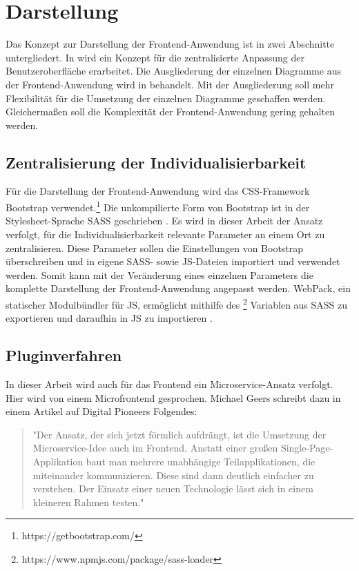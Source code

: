 \section{Darstellung}
\label{sec:darstellung}
Das Konzept zur Darstellung der Frontend-Anwendung ist in zwei Abschnitte untergliedert.
In  wird ein Konzept für die
zentralisierte Anpassung der Benutzeroberfläche erarbeitet. Die Ausgliederung der einzelnen
Diagramme aus der Frontend-Anwendung wird in  behandelt.
Mit der Ausgliederung soll mehr Flexibilität für die Umsetzung der einzelnen Diagramme geschaffen werden.
Gleichermaßen soll die Komplexität der Frontend-Anwendung gering gehalten werden.

\subsection{Zentralisierung der Individualisierbarkeit}
\label{subsec:zentralisierungderindividualisierbarkeit}
Für die Darstellung der Frontend-Anwendung wird das CSS-Framework Bootstrap verwendet.\footnote{https://getbootstrap.com/}
Die unkompilierte Form von Bootstrap ist in der Stylesheet-Sprache SASS geschrieben \cite[2. Abschnitt]{Bootstrap4punkt4}.
Es wird in dieser Arbeit der Ansatz verfolgt, für die Individualisierbarkeit relevante Parameter an einem Ort
zu zentralisieren. Diese Parameter sollen die Einstellungen von Bootstrap überschreiben und
in eigene SASS- sowie JS-Dateien importiert und verwendet werden. Somit kann mit der Veränderung
eines einzelnen Parameters die komplette Darstellung der Frontend-Anwendung angepasst werden.
WebPack, ein statischer Modulbündler für JS, ermöglicht mithilfe des \footnote{https://www.npmjs.com/package/sass-loader} Variablen
aus SASS zu exportieren und daraufhin in JS zu importieren \cite{ShareSCSSwithJS}.

\subsection{Pluginverfahren}
\label{subsec:pluginverfahren}
In dieser Arbeit wird auch für das Frontend ein Microservice-Ansatz verfolgt.
Hier wird von einem Microfrontend gesprochen. Michael Geers schreibt dazu
in einem Artikel auf Digital Pioneers Folgendes:

\begin{quote}
"Der Ansatz, der sich jetzt förmlich aufdrängt, ist die Umsetzung der Microservice\hyp{}Idee
auch im Frontend. Anstatt einer ­großen Single\hyp{}Page\hyp{}Applikation baut man mehrere unabhängige
Teilapplikationen, die miteinander kommunizieren. Diese sind dann deutlich einfacher zu verstehen.
Der Einsatz einer neuen Technologie lässt sich in einem kleineren Rahmen testen."\cite{MicrofrontendT3N}
\end{quote}

